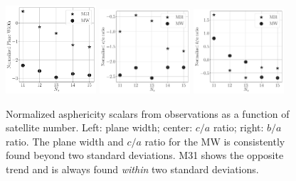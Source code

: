 \documentclass[a4paper,fleqn,usenatbib]{mnras}
\begin{document}
\begin{figure}
\centering
\includegraphics[width=0.30\textwidth]{normalized_width_n_dependence.pdf}
\includegraphics[width=0.30\textwidth]{normalized_ca_ratio_n_dependence.pdf}
\includegraphics[width=0.30\textwidth]{normalized_ba_ratio_n_dependence.pdf}
\caption{Normalized asphericity scalars from observations as a function
  of satellite number. Left: plane width; center: $c/a$ ratio;
  right: $b/a$ ratio. 
  The plane width and $c/a$ ratio for the MW is
  consistently found beyond two standard
  deviations.
  M31 shows the opposite trend and is always found
  \emph{within} two standard deviations. \label{fig:normalized_n}} 
\end{figure}
\end{document}
